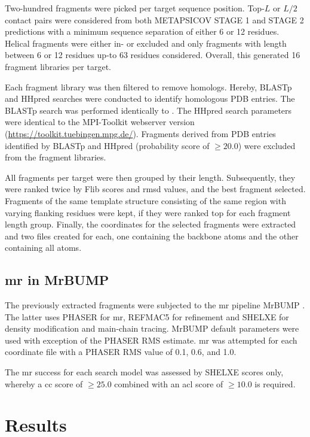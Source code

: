 Two-hundred fragments were picked per target sequence position. Top-$L$ or $L/2$ contact pairs were considered from both METAPSICOV STAGE 1 and STAGE 2 predictions with a minimum sequence separation of either 6 or 12 residues. Helical fragments were either in- or excluded and only fragments with length between 6 or 12 residues up-to 63 residues considered. Overall, this generated 16 fragment libraries per target.

Each fragment library was then filtered to remove homologs. Hereby, BLASTp and HHpred \cite{Soding2005-sx} searches were conducted to identify homologous PDB entries. The BLASTp search was performed identically to \cite{De_Oliveira2015-ba}. The HHpred search parameters were identical to the MPI-Toolkit \cite{Biegert2006-ny} webserver version (\url{https://toolkit.tuebingen.mpg.de/}). Fragments derived from PDB entries identified by BLASTp and HHpred (probability score of $\geq20.0$) were excluded from the fragment libraries.

All fragments per target were then grouped by their length. Subsequently, they were ranked twice by Flib scores and \gls{rmsd} values, and the best fragment selected. Fragments of the same template structure consisting of the same region with varying flanking residues were kept, if they were ranked top for each fragment length group. Finally, the coordinates for the selected fragments were extracted and two files created for each, one containing the backbone atoms and the other containing all atoms.

\subsection{\acrlong{mr} in MrBUMP}
The previously extracted fragments were subjected to the \gls{mr} pipeline MrBUMP \cite{Keegan2008-hk}. The latter uses PHASER \cite{McCoy2007-bf} for \gls{mr}, REFMAC5 \cite{Murshudov2011-we} for refinement and SHELXE \cite{Thorn2013-ir} for density modification and main-chain tracing. MrBUMP default parameters were used with exception of the PHASER RMS estimate. \gls{mr} was attempted for each coordinate file with a PHASER RMS value of 0.1, 0.6, and 1.0.

The \gls{mr} success for each search model was assessed by SHELXE scores only, whereby a \gls{cc} score of $\geq25.0$ combined with an \gls{acl} score of $\geq10.0$ is required.


\section{Results}
